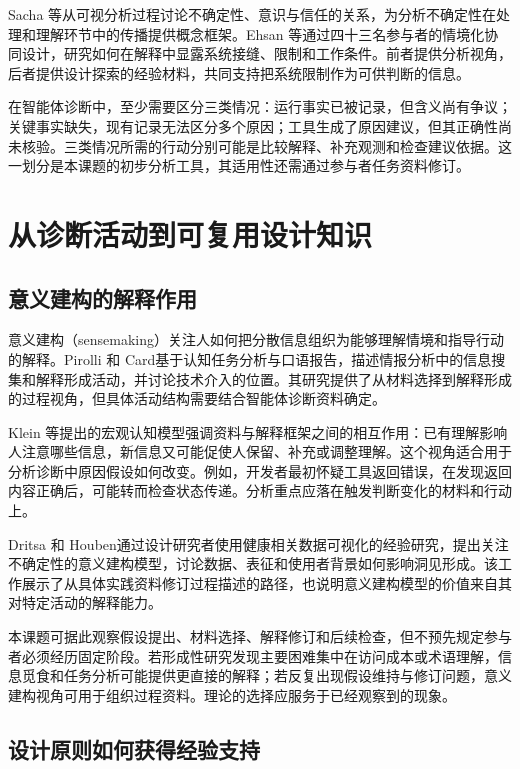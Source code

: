 Sacha 等\cite{ref39}从可视分析过程讨论不确定性、意识与信任的关系，为分析不确定性在处理和理解环节中的传播提供概念框架。Ehsan 等\cite{ref54}通过四十三名参与者的情境化协同设计，研究如何在解释中显露系统接缝、限制和工作条件。前者提供分析视角，后者提供设计探索的经验材料，共同支持把系统限制作为可供判断的信息。

在智能体诊断中，至少需要区分三类情况：运行事实已被记录，但含义尚有争议；关键事实缺失，现有记录无法区分多个原因；工具生成了原因建议，但其正确性尚未核验。三类情况所需的行动分别可能是比较解释、补充观测和检查建议依据。这一划分是本课题的初步分析工具，其适用性还需通过参与者任务资料修订。

\section{从诊断活动到可复用设计知识}

\subsection{意义建构的解释作用}

意义建构（sensemaking）关注人如何把分散信息组织为能够理解情境和指导行动的解释。Pirolli 和 Card\cite{ref17}基于认知任务分析与口语报告，描述情报分析中的信息搜集和解释形成活动，并讨论技术介入的位置。其研究提供了从材料选择到解释形成的过程视角，但具体活动结构需要结合智能体诊断资料确定。

Klein 等\cite{ref11}提出的宏观认知模型强调资料与解释框架之间的相互作用：已有理解影响人注意哪些信息，新信息又可能促使人保留、补充或调整理解。这个视角适合用于分析诊断中原因假设如何改变。例如，开发者最初怀疑工具返回错误，在发现返回内容正确后，可能转而检查状态传递。分析重点应落在触发判断变化的材料和行动上。

Dritsa 和 Houben\cite{ref57}通过设计研究者使用健康相关数据可视化的经验研究，提出关注不确定性的意义建构模型，讨论数据、表征和使用者背景如何影响洞见形成。该工作展示了从具体实践资料修订过程描述的路径，也说明意义建构模型的价值来自其对特定活动的解释能力。

本课题可据此观察假设提出、材料选择、解释修订和后续检查，但不预先规定参与者必须经历固定阶段。若形成性研究发现主要困难集中在访问成本或术语理解，信息觅食和任务分析可能提供更直接的解释；若反复出现假设维持与修订问题，意义建构视角可用于组织过程资料。理论的选择应服务于已经观察到的现象。

\subsection{设计原则如何获得经验支持}

